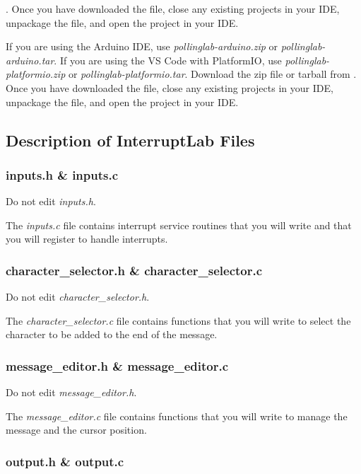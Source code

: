 \filesource.
Once you have downloaded the file, close any existing projects in your IDE, unpackage the file, and open the project in your IDE\@.


If you are using the Arduino IDE, use \textit{pollinglab-arduino.zip} or \textit{pollinglab-arduino.tar}.
If you are using the VS Code with PlatformIO, use \textit{pollinglab-platformio.zip} or \textit{pollinglab-platformio.tar}.
Download the zip file or tarball from \filesource.
Once you have downloaded the file, close any existing projects in your IDE, unpackage the file, and open the project in your IDE\@.

\subsection{Description of InterruptLab Files}

\subsubsection{inputs.h \& inputs.c}

Do not edit \textit{inputs.h}.

The \textit{inputs.c} file contains interrupt service routines that you will write and that you will register to handle interrupts.

\subsubsection{character\_selector.h \& character\_selector.c}

Do not edit \textit{character\_selector.h}.

The \textit{character\_selector.c} file contains functions that you will write to select the character to be added to the end of the message.

\subsubsection{message\_editor.h \& message\_editor.c}

Do not edit \textit{message\_editor.h}.

The \textit{message\_editor.c} file contains functions that you will write to manage the message and the cursor position.

\subsubsection{output.h \& output.c}

